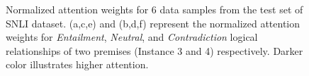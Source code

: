 \documentclass[11pt,a4paper]{article}
\begin{document}
\begin{figure}[ht]
\begin{center}
		\end{center}
		\caption{
			Normalized attention weights for 6 data samples from the test set of SNLI dataset. (a,c,e) and (b,d,f) represent the normalized attention weights for \emph{Entailment}, \emph{Neutral}, and \emph{Contradiction} logical relationships of two premises (Instance 3 and 4) respectively. Darker color illustrates higher attention. 
		}
		\label{fig:att:sample:2}
	\end{figure}
	
\end{document}
